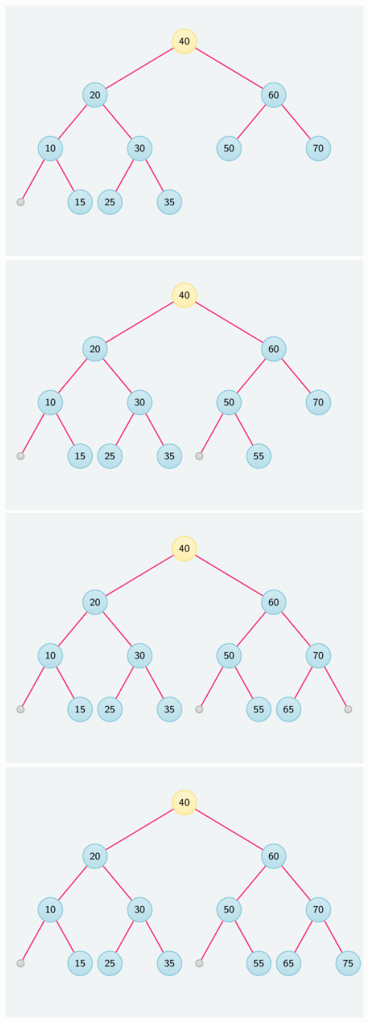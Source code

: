 \documentclass[crop,10pt]{standalone}
\begin{document}
    \includegraphics{frames/tree-09.pdf}
    \includegraphics{frames/tree-10.pdf}
    \includegraphics{frames/tree-11.pdf}
    \includegraphics{frames/tree-12.pdf}
\end{document}
